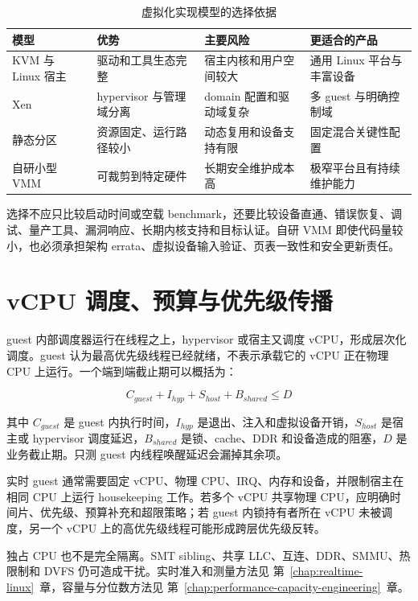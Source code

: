 \begin{table}[H]
  \centering
  \caption{虚拟化实现模型的选择依据}
  \begin{tabular}{p{27mm}p{35mm}p{37mm}p{37mm}}
    \hline
    模型 & 优势 & 主要风险 & 更适合的产品 \\
    \hline
    KVM 与 Linux 宿主 & 驱动和工具生态完整 & 宿主内核和用户空间较大 & 通用 Linux 平台与丰富设备 \\
    Xen & hypervisor 与管理域分离 & domain 配置和驱动域复杂 & 多 guest 与明确控制域 \\
    静态分区 & 资源固定、运行路径较小 & 动态复用和设备支持有限 & 固定混合关键性配置 \\
    自研小型 VMM & 可裁剪到特定硬件 & 长期安全维护成本高 & 极窄平台且有持续维护能力 \\
    \hline
  \end{tabular}
\end{table}

选择不应只比较启动时间或空载 benchmark，还要比较设备直通、错误恢复、调试、量产工具、漏洞响应、长期内核支持和目标认证。自研 VMM 即使代码量较小，也必须承担架构 errata、虚拟设备输入验证、页表一致性和安全更新责任。

\section{vCPU 调度、预算与优先级传播}

guest 内部调度器运行在线程之上，hypervisor 或宿主又调度 vCPU，形成层次化调度。guest 认为最高优先级线程已经就绪，不表示承载它的 vCPU 正在物理 CPU 上运行。一个端到端截止期可以概括为：

\begin{equation}
  C_{guest} + I_{hyp} + S_{host} + B_{shared} \leq D
\end{equation}

其中 $C_{guest}$ 是 guest 内执行时间，$I_{hyp}$ 是退出、注入和虚拟设备开销，$S_{host}$ 是宿主或 hypervisor 调度延迟，$B_{shared}$ 是锁、cache、DDR 和设备造成的阻塞，$D$ 是业务截止期。只测 guest 内线程唤醒延迟会漏掉其余项。

实时 guest 通常需要固定 vCPU、物理 CPU、IRQ、内存和设备，并限制宿主在相同 CPU 上运行 housekeeping 工作。若多个 vCPU 共享物理 CPU，应明确时间片、优先级、预算补充和超限策略；若 guest 内锁持有者所在 vCPU 未被调度，另一个 vCPU 上的高优先级线程可能形成跨层优先级反转。

独占 CPU 也不是完全隔离。SMT sibling、共享 LLC、互连、DDR、SMMU、热限制和 DVFS 仍可造成干扰。实时准入和测量方法见 \mbox{第~\ref{chap:realtime-linux}~章}，容量与分位数方法见 \mbox{第~\ref{chap:performance-capacity-engineering}~章}。

